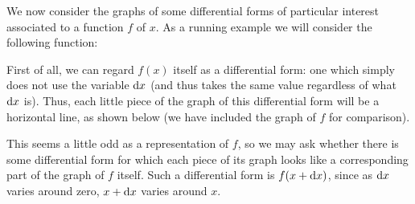 We now consider the graphs of some differential forms of particular interest associated to a function $f$ of $x$.
As a running example we will consider the following function:
\def\axes{
    \draw[<->] (-5,0) -- (5,0);
    \draw[<->] (0,-2) -- (0,2);
    \foreach \x in {1,2,3,4} \draw (\x,.2) -- (\x,-.2);
    \foreach \x in {1,2,3,4} \draw (-\x,.2) -- (-\x,-.2);
}
\def\fctn#1{\draw[#1] (-5,.3) to[out=30,in=170] (-4,1) to[out=-10,in=110] (-2,-1.2) to[out=-70,in=-130] (1,.2) to[out=50,in=120] (5,-.5);}
\def\heights{-4/1cm/-.05,-3/.55cm/-.3,-2/-1.2cm/-.6,-1/-1.5cm/.15,0/-.85cm/.28,1/.2cm/.32,2/.81cm/.08,3/.85cm/-.05,4/.47cm/-.18}
\begin{center}
\end{center}
First of all, we can regard $f(x)$ itself as a differential form: one which simply does not use the variable ${\mathrm{d} x}$ (and thus takes the same value regardless of what ${\mathrm{d} x}$ is).
Thus, each little piece of the graph of this differential form will be a horizontal line, as shown below (we have included the graph of $f$ for comparison).
\begin{center}
\end{center}
This seems a little odd as a representation of $f$, so we may ask whether there is some differential form for which each piece of its graph looks like a corresponding part of the graph of $f$ itself.
Such a differential form is $f(x+{\mathrm{d} x})$, since as ${\mathrm{d} x}$ varies around zero, $x+{\mathrm{d} x}$ varies around $x$.
\begin{center}
\end{center}
